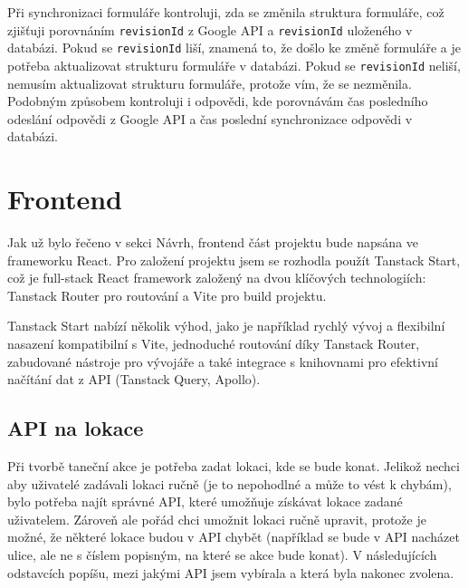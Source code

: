 Při synchronizaci formuláře kontroluji, zda se změnila struktura formuláře, což zjišťuji porovnáním \texttt{revisionId} z Google API a \texttt{revisionId} uloženého v databázi. Pokud se \texttt{revisionId} liší, znamená to, že došlo ke změně formuláře a je potřeba aktualizovat strukturu formuláře v databázi. Pokud se \texttt{revisionId} neliší, nemusím aktualizovat strukturu formuláře, protože vím, že se nezměnila. Podobným způsobem kontroluji i odpovědi, kde porovnávám čas posledního odeslání odpovědi z Google API a čas poslední synchronizace odpovědi v databázi.

\section{Frontend}
Jak už bylo řečeno v sekci Návrh, frontend část projektu bude napsána ve frameworku React. Pro založení projektu jsem se rozhodla použít Tanstack Start, což je full-stack React framework založený na dvou klíčových technologiích: Tanstack Router pro routování a Vite pro build projektu. \cite{tanstack_react_overview}

Tanstack Start nabízí několik výhod, jako je například rychlý vývoj a flexibilní nasazení kompatibilní s Vite, jednoduché routování díky Tanstack Router, zabudované nástroje pro vývojáře a také integrace s knihovnami pro efektivní načítání dat z API (Tanstack Query, Apollo). \cite{tanstack_react_comparison}

\subsection{API na lokace}
Při tvorbě taneční akce je potřeba zadat lokaci, kde se bude konat. Jelikož nechci aby uživatelé zadávali lokaci ručně (je to nepohodlné a může to vést k chybám), bylo potřeba najít správné API, které umožňuje získávat lokace zadané uživatelem. Zároveň ale pořád chci umožnit lokaci ručně upravit, protože je možné, že některé lokace budou v API chybět (například se bude v API nacházet ulice, ale ne s číslem popisným, na které se akce bude konat). V následujících odstavcích popíšu, mezi jakými API jsem vybírala a která byla nakonec zvolena.


